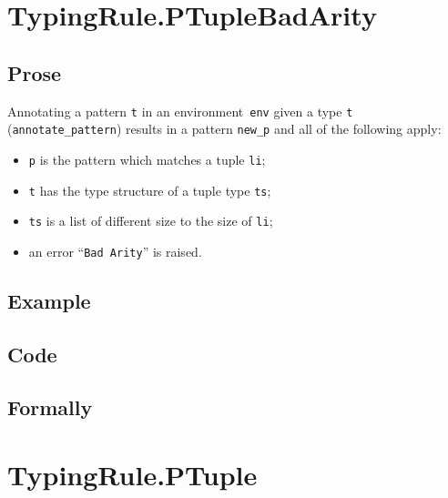 \documentclass{book}
\begin{document}
\section{TypingRule.PTupleBadArity \label{sec:TypingRule.PTupleBadArity}}

  \subsection{Prose}
   Annotating a pattern \texttt{t} in an environment~\texttt{env} given a type \texttt{t} (\texttt{annotate\_pattern}) results in a pattern \texttt{new\_p} and all of the following apply:
   \begin{itemize}
   \item \texttt{p} is the pattern which matches a tuple \texttt{li};
   \item \texttt{t} has the type structure of a tuple type \texttt{ts};
   \item \texttt{ts} is a list of different size to the size of \texttt{li};
   \item an error ``\texttt{Bad Arity}'' is raised.
   \end{itemize}

  \subsection{Example}

  \subsection{Code}

\begin{emptyformal}
    \subsection{Formally}
\end{emptyformal}



\section{TypingRule.PTuple \label{sec:TypingRule.PTuple}}
\end{document}
